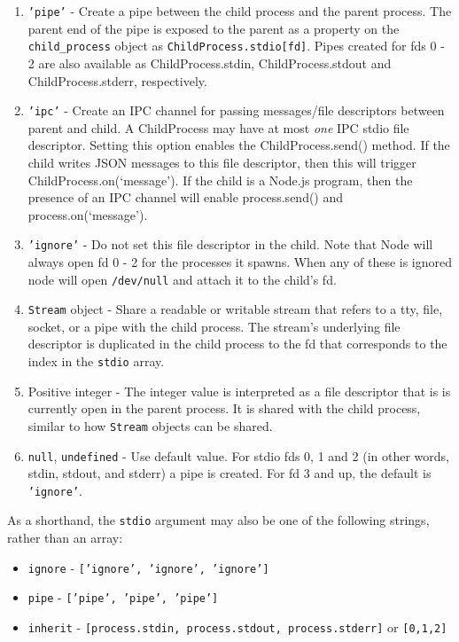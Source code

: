 \begin{enumerate}
\item
  \texttt{'pipe'} - Create a pipe between the child process and the
  parent process. The parent end of the pipe is exposed to the parent as
  a property on the \texttt{child\_process} object as
  \texttt{ChildProcess.stdio{[}fd{]}}. Pipes created for fds 0 - 2 are
  also available as ChildProcess.stdin, ChildProcess.stdout and
  ChildProcess.stderr, respectively.
\item
  \texttt{'ipc'} - Create an IPC channel for passing messages/file
  descriptors between parent and child. A ChildProcess may have at most
  \emph{one} IPC stdio file descriptor. Setting this option enables the
  ChildProcess.send() method. If the child writes JSON messages to this
  file descriptor, then this will trigger ChildProcess.on(`message'). If
  the child is a Node.js program, then the presence of an IPC channel
  will enable process.send() and process.on(`message').
\item
  \texttt{'ignore'} - Do not set this file descriptor in the child. Note
  that Node will always open fd 0 - 2 for the processes it spawns. When
  any of these is ignored node will open \texttt{/dev/null} and attach
  it to the child's fd.
\item
  \texttt{Stream} object - Share a readable or writable stream that
  refers to a tty, file, socket, or a pipe with the child process. The
  stream's underlying file descriptor is duplicated in the child process
  to the fd that corresponds to the index in the \texttt{stdio} array.
\item
  Positive integer - The integer value is interpreted as a file
  descriptor that is is currently open in the parent process. It is
  shared with the child process, similar to how \texttt{Stream} objects
  can be shared.
\item
  \texttt{null}, \texttt{undefined} - Use default value. For stdio fds
  0, 1 and 2 (in other words, stdin, stdout, and stderr) a pipe is
  created. For fd 3 and up, the default is \texttt{'ignore'}.
\end{enumerate}

As a shorthand, the \texttt{stdio} argument may also be one of the
following strings, rather than an array:

\begin{itemize}
\item
  \texttt{ignore} - \texttt{{[}'ignore', 'ignore', 'ignore'{]}}
\item
  \texttt{pipe} - \texttt{{[}'pipe', 'pipe', 'pipe'{]}}
\item
  \texttt{inherit} -
  \texttt{{[}process.stdin, process.stdout, process.stderr{]}} or
  \texttt{{[}0,1,2{]}}
\end{itemize}

